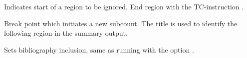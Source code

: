 
\begin{description}
\def\option[#1]{\item[\bigcode{#1}]}

\option[ignore]Indicates start of a region to be ignored. End region with the TC-instruction .

\option[break \textit{title}]Break point which initiates a new subcount. The title is used to identify the following region in the summary output.

\option[incbib]Sets bibliography inclusion, same as running \TeXcount{} with the option .

\end{description}


